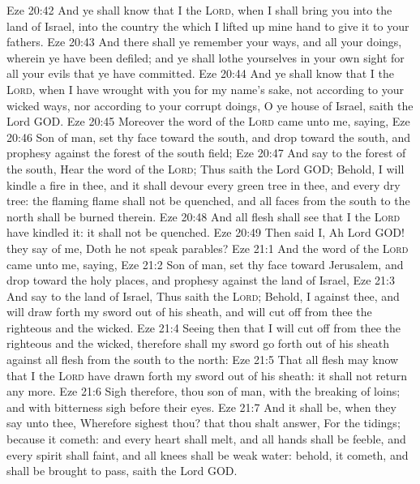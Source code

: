 \vs Eze 20:42 And ye shall know that I  the \textsc{Lord}, when I shall bring you into the land of Israel, into the country  the which I lifted up mine hand to give it to your fathers.
\vs Eze 20:43 And there shall ye remember your ways, and all your doings, wherein ye have been defiled; and ye shall lothe yourselves in your own sight for all your evils that ye have committed.
\vs Eze 20:44 And ye shall know that I  the \textsc{Lord}, when I have wrought with you for my name's sake, not according to your wicked ways, nor according to your corrupt doings, O ye house of Israel, saith the Lord GOD.
\vs Eze 20:45 Moreover the word of the \textsc{Lord} came unto me, saying,
\vs Eze 20:46 Son of man, set thy face toward the south, and drop  toward the south, and prophesy against the forest of the south field;
\vs Eze 20:47 And say to the forest of the south, Hear the word of the \textsc{Lord}; Thus saith the Lord GOD; Behold, I will kindle a fire in thee, and it shall devour every green tree in thee, and every dry tree: the flaming flame shall not be quenched, and all faces from the south to the north shall be burned therein.
\vs Eze 20:48 And all flesh shall see that I the \textsc{Lord} have kindled it: it shall not be quenched.
\vs Eze 20:49 Then said I, Ah Lord GOD! they say of me, Doth he not speak parables?
\vs Eze 21:1 And the word of the \textsc{Lord} came unto me, saying,
\vs Eze 21:2 Son of man, set thy face toward Jerusalem, and drop  toward the holy places, and prophesy against the land of Israel,
\vs Eze 21:3 And say to the land of Israel, Thus saith the \textsc{Lord}; Behold, I  against thee, and will draw forth my sword out of his sheath, and will cut off from thee the righteous and the wicked.
\vs Eze 21:4 Seeing then that I will cut off from thee the righteous and the wicked, therefore shall my sword go forth out of his sheath against all flesh from the south to the north:
\vs Eze 21:5 That all flesh may know that I the \textsc{Lord} have drawn forth my sword out of his sheath: it shall not return any more.
\vs Eze 21:6 Sigh therefore, thou son of man, with the breaking of  loins; and with bitterness sigh before their eyes.
\vs Eze 21:7 And it shall be, when they say unto thee, Wherefore sighest thou? that thou shalt answer, For the tidings; because it cometh: and every heart shall melt, and all hands shall be feeble, and every spirit shall faint, and all knees shall be weak  water: behold, it cometh, and shall be brought to pass, saith the Lord GOD.
